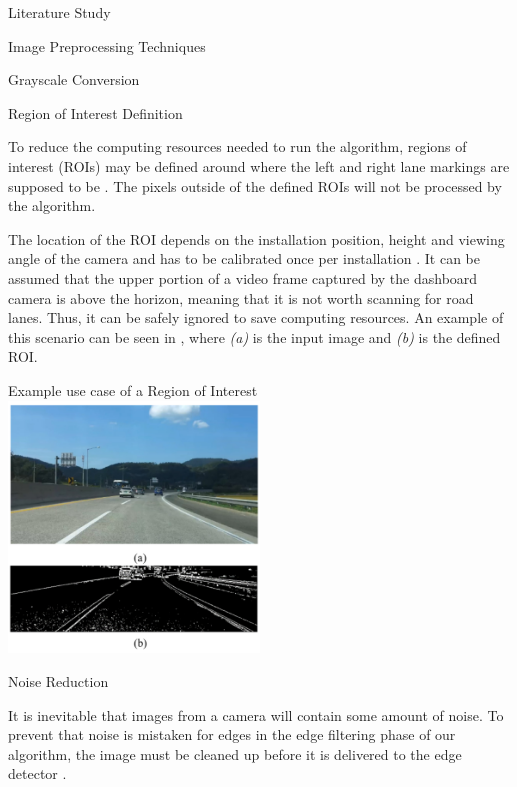 \documentclass{matthijs}
\begin{document}
\begin{hoofdstuk}{Literature Study}
\begin{paragraaf}{Image Preprocessing Techniques}
\begin{subparagraaf}{Grayscale Conversion}
			\end{subparagraaf}

			\begin{subparagraaf}{Region of Interest Definition}

				To reduce the computing resources needed to run the algorithm, regions of interest (ROIs) may be defined around where the left and right lane markings are supposed to be \cite{el2020novel}.
				The pixels outside of the defined ROIs will not be processed by the algorithm.
								
				\bigskip

				The location of the ROI depends on the installation position, height and viewing angle of the camera and has to be calibrated once per installation \cite{malmir2019design}.
				It can be assumed that the upper portion of a video frame captured by the dashboard camera is above the horizon, meaning that it is not worth scanning for road lanes.
				Thus, it can be safely ignored to save computing resources.
				An example of this scenario can be seen in , where \textit{(a)} is the input image and \textit{(b)} is the defined ROI.

				\begin{figuur}{Example use case of a Region of Interest}
					\includegraphics[width=0.5\textwidth]{malmir2019design-img1.png}
					\cite{malmir2019design}
				\end{figuur}

			\end{subparagraaf}

			\begin{subparagraaf}{Noise Reduction}

				It is inevitable that images from a camera will contain some amount of noise.
				To prevent that noise is mistaken for edges in the edge filtering phase of our algorithm, the image must be cleaned up before it is delivered to the edge detector \cite{sarab2020canny}.


\end{subparagraaf}
\end{paragraaf}
\end{hoofdstuk}
\end{document}
